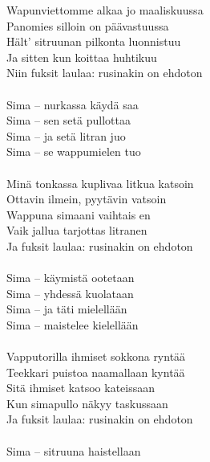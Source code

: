 
            Wapunviettomme alkaa jo maaliskuussa \\
            Panomies silloin on päävastuussa \\
            Hält’ sitruunan pilkonta luonnistuu \\
            Ja sitten kun koittaa huhtikuu \\
            Niin fuksit laulaa: rusinakin on ehdoton \\
\hspace{10mm} \\
            Sima – nurkassa käydä saa \\
            Sima – sen setä pullottaa \\
            Sima – ja setä litran juo \\
            Sima – se wappumielen tuo \\
\hspace{10mm} \\
            Minä tonkassa kuplivaa litkua katsoin \\
            Ottavin ilmein, pyytävin vatsoin \\
            Wappuna simaani vaihtais en \\
            Vaik jallua tarjottas litranen \\
            Ja fuksit laulaa: rusinakin on ehdoton \\
\hspace{10mm} \\
            Sima – käymistä ootetaan \\
            Sima – yhdessä kuolataan \\
            Sima – ja täti mielellään \\
            Sima – maistelee kielellään \\
\hspace{10mm} \\
            Vapputorilla ihmiset sokkona ryntää \\
            Teekkari puistoa naamallaan kyntää \\
            Sitä ihmiset katsoo kateissaan \\
            Kun simapullo näkyy taskussaan \\
            Ja fuksit laulaa: rusinakin on ehdoton \\
\hspace{10mm} \\
            Sima – sitruuna haistellaan \\

